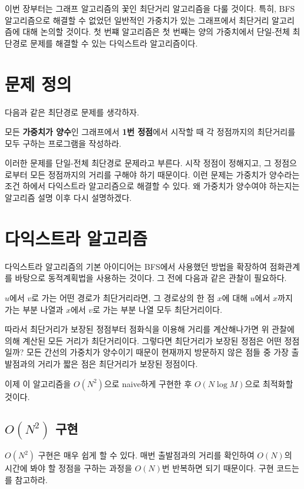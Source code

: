 이번 장부터는 그래프 알고리즘의 꽃인 최단거리 알고리즘을 다룰 것이다. 특히, BFS 알고리즘으로 해결할 수 없었던 일반적인 가중치가 있는 그래프에서 최단거리 알고리즘에 대해 논의할 것이다. 첫 번쨰 알고리즘은 첫 번째는 양의 가중치에서 단일-전체 최단경로 문제를 해결할 수 있는 다익스트라 알고리즘이다.

\section{문제 정의}
다음과 같은 최단경로 문제를 생각하자.

\begin{example} \label{ex: Dijkstra}
    모든 \textbf{가중치가 양수}인 그래프에서 \textbf{1번 정점}에서 시작할 때 각 정점까지의 최단거리를 모두 구하는 프로그램을 작성하라.
\end{example}

이러한 문제를 단일-전체 최단경로 문제라고 부른다. 시작 정점이 정해지고, 그 정점으로부터 모든 정점까지의 거리를 구해야 하기 때문이다.
이런 문제는 가중치가 양수라는 조건 하에서 다익스트라 알고리즘으로 해결할 수 있다. 왜 가중치가 양수여야 하는지는 알고리즘 설명 이후 다시 설명하겠다.

\section{다익스트라 알고리즘}
다익스트라 알고리즘의 기본 아이디어는 BFS에서 사용했던 방법을 확장하여 점화관계를 바탕으로 동적계획법을 사용하는 것이다. 그 전에 다음과 같은 관찰이 필요하다.

\begin{obs}
    $u$에서 $v$로 가는 어떤 경로가 최단거리라면, 그 경로상의 한 점 $x$에 대해 $u$에서 $x$까지 가는 부분 나열과 $x$에서 $v$로 가는 부분 나열 모두 최단거리이다.
\end{obs}

따라서 최단거리가 보장된 정점부터 점화식을 이용해 거리를 계산해나가면 위 관찰에 의해 계산된 모든 거리가 최단거리이다. 그렇다면 최단거리가 보장된 정점은 어떤 정점일까?
모든 간선의 가중치가 양수이기 때문이 현재까지 방문하지 않은 점들 중 가장 출발점과의 거리가 짧은 점은 최단거리가 보장된 정점이다.

이제 이 알고리즘을 $O(N^2)$으로 naive하게 구현한 후 $O(N \log M)$으로 최적화할 것이다.

\subsection{$O(N^2)$ 구현}
$O(N^2)$ 구현은 매우 쉽게 할 수 있다. 매번 출발점과의 거리를 확인하여 $O(N)$의 시간에 봐야 할 정점을 구하는 과정을 $O(N)$번 반복하면 되기 때문이다. 구현 코드는 를 참고하라.

